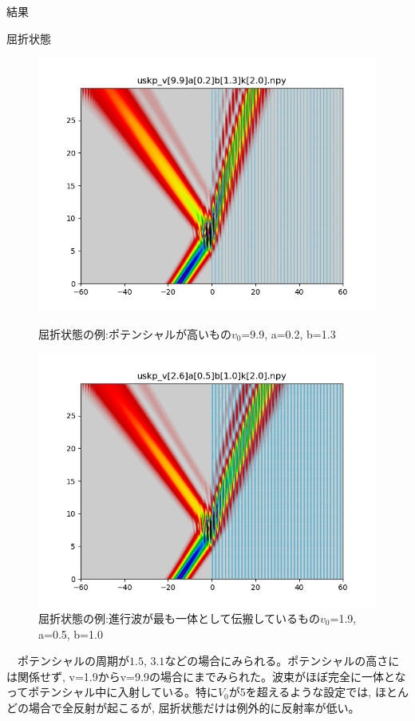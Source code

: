 \documentclass[a4paper, lualatex]{bxjsarticle}
\begin{document}
\begin{section}{結果}
\begin{subsection}{屈折状態}
\begin{figure}[h]
\begin{minipage}{0.5\hsize}
                \includegraphics[width=0.9\hsize]{kussetsu3.png}
                \caption{屈折状態の例:ポテンシャルが高いもの$v_0$=9.9, a=0.2, b=1.3}
            \end{minipage}
            \begin{minipage}{0.5\hsize}
                \centering
                \includegraphics[width=0.9\hsize]{kussetsu4.png}
                \caption{屈折状態の例:進行波が最も一体として伝搬しているもの$v_0$=1.9, a=0.5, b=1.0}
            \end{minipage}
        \end{figure}
    \par　ポテンシャルの周期が$1.5$, $3.1$などの場合にみられる。ポテンシャルの高さには関係せず, v=1.9からv=9.9の場合にまでみられた。波束がほぼ完全に一体となってポテンシャル中に入射している。特に$V_0$が5を超えるような設定では, ほとんどの場合で全反射が起こるが, 屈折状態だけは例外的に反射率が低い。

\end{subsection}
\end{section}
\end{document}

